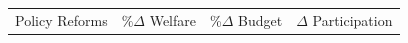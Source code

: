 \newcommand{\gradPP}[1]{%
    \ifdim#1pt=0pt
        \cellcolor{white!\opacity} #1
    \else
        \ifdim#1pt>0pt
            \pgfmathparse{int(round(min(100, 100*(#1/3.46))))}%
            \xdef\tempa{\pgfmathresult}
            \cellcolor{blue!\tempa!white!\opacity} #1
        \else
            \pgfmathparse{int(round(min(100, 100*(-#1/3.46))))}%
            \xdef\tempa{\pgfmathresult}
            \cellcolor{red!\tempa!white!\opacity} #1
        \fi
    \fi
}

\begin{tabular}{llllllllll}%
   \toprule
\hline
 \multicolumn{2}{c}{Policy Reforms}&\multicolumn{2}{c}{$\%\Delta$ Welfare}&\multicolumn{3}{c}{\%$\Delta$ Budget}&\multicolumn{3}{c}{$\Delta$ Participation}\\


\end{tabular}
